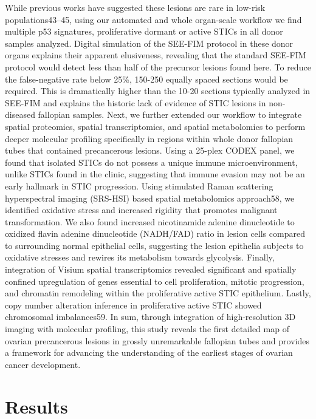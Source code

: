 \begin{refsection}
    While previous works have suggested these lesions are rare in low-risk populations43–45, using our automated and whole organ-scale workflow we find multiple p53 signatures, proliferative dormant or active STICs in all donor samples analyzed. Digital simulation of the SEE-FIM protocol in these donor organs explains their apparent elusiveness, revealing that the standard SEE-FIM protocol would detect less than half of the precursor lesions found here. To reduce the false-negative rate below 25\%, 150-250 equally spaced sections would be required. This is dramatically higher than the 10-20 sections typically analyzed in SEE-FIM and explains the historic lack of evidence of STIC lesions in non-diseased fallopian samples.
    Next, we further extended our workflow to integrate spatial proteomics, spatial transcriptomics, and spatial metabolomics to perform deeper molecular profiling specifically in regions within whole donor fallopian tubes that contained precancerous lesions. Using a 25-plex CODEX panel, we found that isolated STICs do not possess a unique immune microenvironment, unlike STICs found in the clinic, suggesting that immune evasion may not be an early hallmark in STIC progression. Using stimulated Raman scattering hyperspectral imaging (SRS-HSI) based spatial metabolomics approach58, we identified oxidative stress and increased rigidity that promotes malignant transformation. We also found increased nicotinamide adenine dinucleotide to oxidized flavin adenine dinucleotide (NADH/FAD) ratio in lesion cells compared to surrounding normal epithelial cells, suggesting the lesion epithelia subjects to oxidative stresses and rewires its metabolism towards glycolysis. Finally, integration of Visium spatial transcriptomics revealed significant and spatially confined upregulation of genes essential to cell proliferation, mitotic progression, and chromatin remodeling within the proliferative active STIC epithelium. Lastly, copy number alteration inference in proliferative active STIC showed chromosomal imbalances59. 
    In sum, through integration of high-resolution 3D imaging with molecular profiling, this study reveals the first detailed map of ovarian precancerous lesions in grossly unremarkable fallopian tubes and provides a framework for advancing the understanding of the earliest stages of ovarian cancer development.
    
    \section{Results}
    

\end{refsection}
